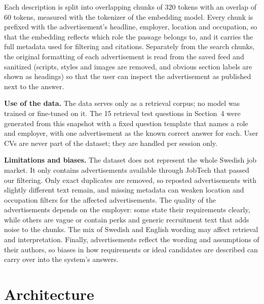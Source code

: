 \documentclass[a4paper,10pt]{article}
\begin{document}
Each description is split into overlapping chunks of 320 tokens with an overlap of 60 tokens, measured with the tokenizer of the embedding model. Every chunk is prefixed with the advertisement's headline, employer, location and occupation, so that the embedding reflects which role the passage belongs to, and it carries the full metadata used for filtering and citations. Separately from the search chunks, the original formatting of each advertisement is read from the saved feed and sanitized (scripts, styles and images are removed, and obvious section labels are shown as headings) so that the user can inspect the advertisement as published next to the answer.

\textbf{Use of the data.}
The data serves only as a retrieval corpus; no model was trained or fine-tuned on it. The 15 retrieval test questions in Section~4 were generated from this snapshot with a fixed question template that names a role and employer, with one advertisement as the known correct answer for each. User CVs are never part of the dataset; they are handled per session only.

\textbf{Limitations and biases.}
The dataset does not represent the whole Swedish job market. It only contains advertisements available through JobTech that passed our filtering. Only exact duplicates are removed, so reposted advertisements with slightly different text remain, and missing metadata can weaken location and occupation filters for the affected advertisements. The quality of the advertisements depends on the employer: some state their requirements clearly, while others are vague or contain perks and generic recruitment text that adds noise to the chunks. The mix of Swedish and English wording may affect retrieval and interpretation. Finally, advertisements reflect the wording and assumptions of their authors, so biases in how requirements or ideal candidates are described can carry over into the system's answers.

\section{Architecture}
\end{document}
